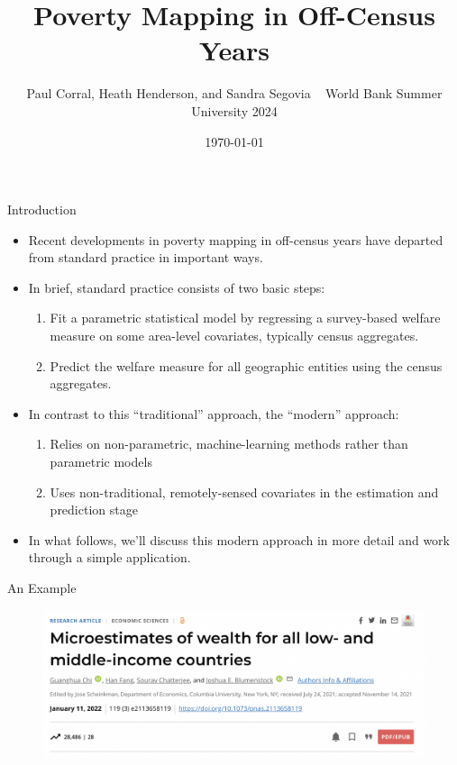 \documentclass[aspectratio=169, xcolor=dvipsnames]{beamer}
\title[]{Poverty Mapping in Off-Census Years}
\date{\today}
\author[]{Paul Corral, Heath Henderson, and Sandra Segovia \newline
~ \newline
World Bank Summer University 2024}
\begin{document}

\begin{frame}
\titlepage
\end{frame}

\begin{frame}{Introduction}
\begin{itemize}
\item Recent developments in poverty mapping in off-census years have
departed from standard practice in important ways.
\item In brief, standard practice consists of two basic steps:
\begin{enumerate}
\item Fit a parametric statistical model by regressing a survey-based 
welfare measure on some area-level covariates, typically census aggregates.
\item Predict the welfare measure for all geographic entities using the census
aggregates.
\end{enumerate}
\item In contrast to this ``traditional'' approach, the ``modern'' approach:
\begin{enumerate}
\item Relies on non-parametric, machine-learning methods rather than 
parametric models
\item Uses non-traditional, remotely-sensed covariates in the estimation and
prediction stage
\end{enumerate}
\item In what follows, we'll discuss this modern approach in more detail and 
work through a simple application.
\end{itemize}
\end{frame}

\begin{frame}{An Example}
\begin{figure}[h!]
  \centering
  \includegraphics[width=0.8 \textwidth]{Chi_1}
\end{figure}
\end{frame}
\end{document}
